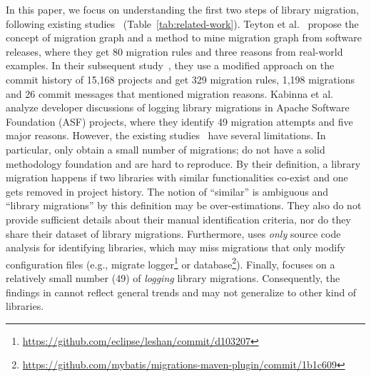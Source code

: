 \documentclass[sigconf, screen]{acmart}
\begin{document}
In this paper, we focus on understanding the first two steps of library migration, following existing studies~\cite{teyton2012mining, teyton2014study, kabinna2016logging} (Table~\ref{tab:related-work}). 
Teyton et al.~\cite{teyton2012mining} propose the concept of migration graph and a method to mine migration graph from software releases, where they get 80 migration rules and three reasons from real-world examples. 
In their subsequent study~\cite{teyton2014study}, they use a modified approach on the commit history of 15,168 projects and get 329 migration rules, 1,198 migrations and 26 commit messages that mentioned migration reasons.
Kabinna et al.~\cite{kabinna2016logging} analyze developer discussions of logging library migrations in Apache Software Foundation (ASF) projects, where they identify 49 migration attempts and five major reasons.
However, the existing studies~\cite{teyton2012mining, teyton2014study, kabinna2016logging} have several limitations.
In particular, %
\cite{teyton2012mining} only obtain a small number of migrations;
\cite{teyton2012mining, teyton2014study} do not have a solid methodology foundation and are hard to reproduce. 
By their definition, a library migration happens if two libraries with similar functionalities co-exist and one gets removed in project history. 
The notion of ``similar'' is ambiguous and ``library migrations'' by this definition may be over-estimations. 
They also do not provide sufficient details about their manual identification criteria, nor do they share their dataset of library migrations.
Furthermore, %
\cite{teyton2014study} uses \textit{only} source code analysis for identifying libraries, which may miss migrations that only modify configuration files (e.g., migrate logger\footnote{\url{https://github.com/eclipse/leshan/commit/d103207}} or database\footnote{\url{https://github.com/mybatis/migrations-maven-plugin/commit/1b1c609}}). 
Finally, %
\cite{kabinna2016logging} focuses %
on a relatively small number (49) of \textit{logging} library migrations. Consequently, the findings in %
\cite{kabinna2016logging} cannot reflect general trends and may not generalize to other kind of libraries.
\end{document}
